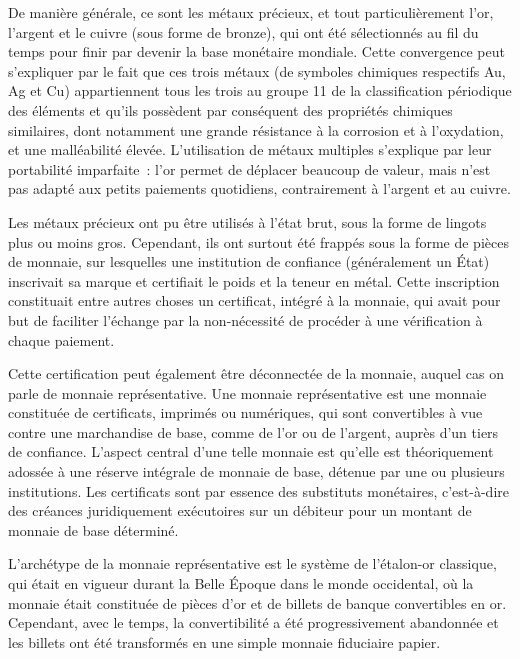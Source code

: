 De manière générale, ce sont les métaux précieux, et tout particulièrement l'or, l'argent et le cuivre (sous forme de bronze), qui ont été sélectionnés au fil du temps pour finir par devenir la base monétaire mondiale. Cette convergence peut s'expliquer par le fait que ces trois métaux (de symboles chimiques respectifs Au, Ag et Cu) appartiennent tous les trois au groupe 11 de la classification périodique des éléments et qu'ils possèdent par conséquent des propriétés chimiques similaires, dont notamment une grande résistance à la corrosion et à l'oxydation, et une malléabilité élevée. L'utilisation de métaux multiples s'explique par leur portabilité imparfaite~: l'or permet de déplacer beaucoup de valeur, mais n'est pas adapté aux petits paiements quotidiens, contrairement à l'argent et au cuivre. %

Les métaux précieux ont pu être utilisés à l'état brut, sous la forme de lingots plus ou moins gros. Cependant, ils ont surtout été frappés sous la forme de pièces de monnaie, sur lesquelles une institution de confiance (généralement un État) inscrivait sa marque et certifiait le poids et la teneur en métal. Cette inscription constituait entre autres choses un certificat, intégré à la monnaie, qui avait pour but de faciliter l'échange par la non-nécessité de procéder à une vérification à chaque paiement.


Cette certification peut également être déconnectée de la monnaie, auquel cas on parle de monnaie représentative. Une monnaie représentative est une monnaie constituée de certificats, imprimés ou numériques, qui sont convertibles à vue contre une marchandise de base, comme de l'or ou de l'argent, auprès d'un tiers de confiance. L'aspect central d'une telle monnaie est qu'elle est théoriquement adossée à une réserve intégrale de monnaie de base, détenue par une ou plusieurs institutions. Les certificats sont par essence des substituts monétaires, c'est-à-dire des créances juridiquement exécutoires sur un débiteur pour un montant de monnaie de base déterminé. %

L'archétype de la monnaie représentative est le système de l'étalon-or classique, qui était en vigueur durant la Belle Époque dans le monde occidental, où la monnaie était constituée de pièces d'or et de billets de banque convertibles en or. Cependant, avec le temps, la convertibilité a été progressivement abandonnée et les billets ont été transformés en une simple monnaie fiduciaire papier. %

